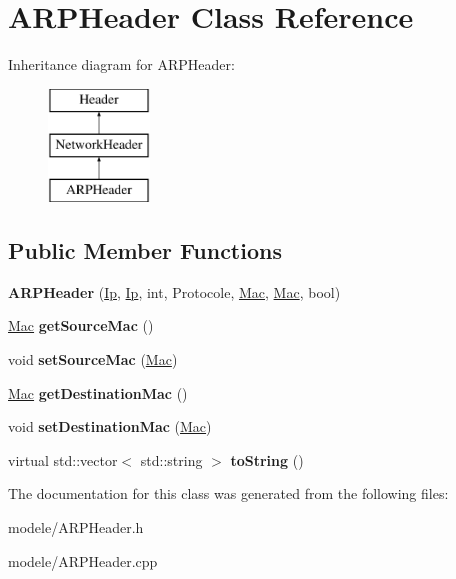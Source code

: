 \hypertarget{class_a_r_p_header}{\section{A\-R\-P\-Header Class Reference}
\label{class_a_r_p_header}
}
Inheritance diagram for A\-R\-P\-Header\-:\begin{figure}[H]
\begin{center}
\leavevmode
\includegraphics[height=3.000000cm]{class_a_r_p_header}
\end{center}
\end{figure}
\subsection*{Public Member Functions}
\begin{DoxyCompactItemize}
\item 
\hypertarget{class_a_r_p_header_a93d00a9186be2dcfbebb1856db455249}{{\bfseries A\-R\-P\-Header} (\hyperlink{class_ip}{Ip}, \hyperlink{class_ip}{Ip}, int, Protocole, \hyperlink{class_mac}{Mac}, \hyperlink{class_mac}{Mac}, bool)}\label{class_a_r_p_header_a93d00a9186be2dcfbebb1856db455249}

\item 
\hypertarget{class_a_r_p_header_aadd980575ba1b33ae74e828718d11a5d}{\hyperlink{class_mac}{Mac} {\bfseries get\-Source\-Mac} ()}\label{class_a_r_p_header_aadd980575ba1b33ae74e828718d11a5d}

\item 
\hypertarget{class_a_r_p_header_add5d63460f0c36e03837a18f9e4c8fd9}{void {\bfseries set\-Source\-Mac} (\hyperlink{class_mac}{Mac})}\label{class_a_r_p_header_add5d63460f0c36e03837a18f9e4c8fd9}

\item 
\hypertarget{class_a_r_p_header_ac286abd3f34358f8b9baee13eebd51d2}{\hyperlink{class_mac}{Mac} {\bfseries get\-Destination\-Mac} ()}\label{class_a_r_p_header_ac286abd3f34358f8b9baee13eebd51d2}

\item 
\hypertarget{class_a_r_p_header_aab1e2210eacba2f1d77860f7c5970590}{void {\bfseries set\-Destination\-Mac} (\hyperlink{class_mac}{Mac})}\label{class_a_r_p_header_aab1e2210eacba2f1d77860f7c5970590}

\item 
\hypertarget{class_a_r_p_header_a1d1d40c2eb89deee742591ff23502b13}{virtual std\-::vector$<$ std\-::string $>$ {\bfseries to\-String} ()}\label{class_a_r_p_header_a1d1d40c2eb89deee742591ff23502b13}

\end{DoxyCompactItemize}


The documentation for this class was generated from the following files\-:\begin{DoxyCompactItemize}
\item 
modele/A\-R\-P\-Header.\-h\item 
modele/A\-R\-P\-Header.\-cpp\end{DoxyCompactItemize}
